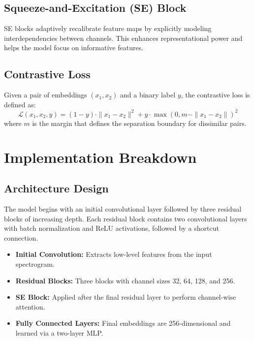 \documentclass[12pt]{article}
\begin{document}
\subsection{Squeeze-and-Excitation (SE) Block}
SE blocks adaptively recalibrate feature maps by explicitly modeling interdependencies between channels. This enhances representational power and helps the model focus on informative features.

\subsection{Contrastive Loss}
Given a pair of embeddings $(x_1, x_2)$ and a binary label $y$, the contrastive loss is defined as:
\begin{equation}
\mathcal{L}(x_1, x_2, y) = (1 - y) \cdot \|x_1 - x_2\|^2 + y \cdot \max(0, m - \|x_1 - x_2\|)^2
\end{equation}
where $m$ is the margin that defines the separation boundary for dissimilar pairs.

\section{Implementation Breakdown}
\subsection{Architecture Design}
The model begins with an initial convolutional layer followed by three residual blocks of increasing depth. Each residual block contains two convolutional layers with batch normalization and ReLU activations, followed by a shortcut connection.

\begin{itemize}
\item \textbf{Initial Convolution:} Extracts low-level features from the input spectrogram.
\item \textbf{Residual Blocks:} Three blocks with channel sizes 32, 64, 128, and 256.
\item \textbf{SE Block:} Applied after the final residual layer to perform channel-wise attention.
\item \textbf{Fully Connected Layers:} Final embeddings are 256-dimensional and learned via a two-layer MLP.
\end{itemize}
\end{document}
